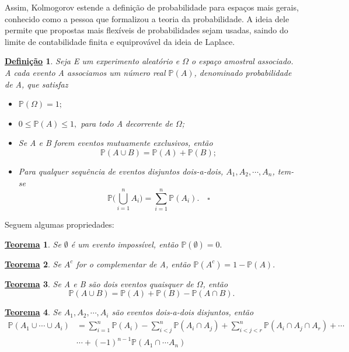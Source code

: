 \documentclass{article}
\newtheorem*{def*}{\underline{Defini\c c\~ao}}
\newtheorem*{theorem*}{\underline{Teorema}}
\begin{document}
Assim, Kolmogorov estende a definição de probabilidade para espaços mais gerais, conhecido como a pessoa que formalizou a teoria da probabilidade. A ideia dele permite que
propostas mais flexíveis de probabilidades sejam usadas, saindo do limite de contabilidade finita e equiprovável da ideia de Laplace.
\begin{def*}
  Seja E um experimento aleatório e \(\Omega \) o espaço amostral associado. A cada evento A associamos um número real
  \(\mathbb{P}(A)\), denominado probabilidade de A, que satisfaz 
  \begin{itemize}
    \item[P1)] \(\mathbb{P}(\Omega )=1;\)
    \item[P2)] \(0\leq \mathbb{P}(A)\leq 1,\) para todo A decorrente de \(\Omega \);
    \item[P3)] Se A e B forem eventos mutuamente exclusivos, então 
      \[
        \mathbb{P}(A\cup B) = \mathbb{P}(A) + \mathbb{P}(B);
      \]
    \item[P4)] Para qualquer sequência de eventos disjuntos dois-a-dois, \(A_{1}, A_{2}, \cdots, A_{n}\), tem-se 
      \[
        \mathbb{P}\biggl(\bigcup_{i=1}^{n}A_{i}\biggr) = \sum\limits_{i=1}^{n}\mathbb{P}(A_{i}).\quad \square
      \]
  \end{itemize}
\end{def*}
Seguem algumas propriedades:
\begin{theorem*}
  Se \(\emptyset\) é um evento impossível, então \(\mathbb{P}(\emptyset) = 0.\)
\end{theorem*}
\begin{theorem*}
  Se \(A^{c}\) for o complementar de A, então \(\mathbb{P}(A^{c}) = 1 - \mathbb{P}(A).\)
\end{theorem*}
\begin{theorem*}
  Se A e B são dois eventos quaisquer de \(\Omega \), então 
  \[
    \mathbb{P}(A\cup B) = \mathbb{P}(A) + \mathbb{P}(B) - \mathbb{P}(A\cap B).
  \]
\end{theorem*}
\begin{theorem*}
  Se \(A_{1}, A_{2}, \cdots, A_{i}\) são eventos dois-a-dois disjuntos, então 
  \begin{align*}
    \mathbb{P}(A_{1}\cup \cdots\cup A_{i}) &= \sum\limits_{i=1}^{n}\mathbb{P}(A_{i}) - \sum\limits_{i < j}^{n} \mathbb{P}(A_{i}\cap A_{j}) + \sum\limits_{i < j < r}^{n} \mathbb{P}(A_{i}\cap A_{j}\cap A_{r}) + \cdots\\
                                           &\cdots + (-1)^{n-1}\mathbb{P}(A_{1}\cap \cdots A_{n})
  \end{align*}
\end{theorem*}
\end{document}
